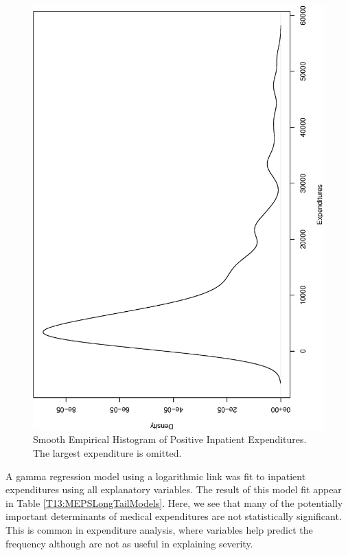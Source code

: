 \begin{figure}[htp]
  \begin{center}
    \includegraphics[width=1\textwidth,angle=270,scale=0.6]{Chapter13GLM/Fig13kernelExpendIP.eps}
    \caption{\label{F13:MEPSkernelExpendIP} \small Smooth Empirical
    Histogram of Positive Inpatient Expenditures. The largest
    expenditure is omitted.}
  \end{center}
\end{figure}

A gamma regression model using a logarithmic link was fit to
inpatient expenditures using all explanatory variables. The result
of this model fit appear in Table \ref{T13:MEPSLongTailModels}.
Here, we see that many of the potentially important determinants of
medical expenditures are not statistically significant. This is
common in expenditure analysis, where variables help predict the
frequency although are not as useful in explaining severity.

